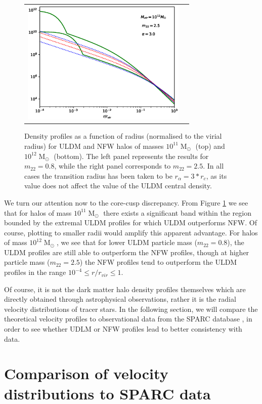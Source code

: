 \documentclass[a4paper,11pt]{article}
\begin{document}
\begin{figure}
\begin{tabular}{cc}
{\includegraphics[width = 3.1in, trim={2.1cm 0.5cm 0cm 0.5cm}]{pics/12_25_3.eps}}
\end{tabular}
\caption{Density profiles as a function of radius (normalised to the virial radius) for ULDM and NFW halos of masses $10^{11}\operatorname{M}_{\odot}$ (top) and $10^{12}\operatorname{M}_{\odot}$ (bottom). The left panel represents the results for $m_{22} = 0.8$, while the right panel corresponds to $m_{22}=2.5$. In all cases the transition radius has been taken to be $r_{\alpha} = 3*r_c$, as its value does not affect the value of the ULDM central density.}\label{fig:profiles}
\end{figure}


We turn our attention now to the core-cusp discrepancy. From Figure \ref{fig:profiles} we see that for halos of mass $10^{11}\operatorname{M}_{\odot}$ there exists a significant band within the region bounded by the extremal ULDM profiles for which ULDM outperforms NFW.  Of course, plotting to smaller radii would amplify this apparent advantage. For halos of mass $10^{12}\operatorname{M}_{\odot}$, we see that for lower ULDM particle mass ($m_{22}=0.8$), the ULDM profiles are still able to outperform the NFW profiles, though at higher particle mass ($m_{22}=2.5$) the  NFW profiles tend to outperform the ULDM profiles in the range $10^{-4}\leq r/r_{vir} \leq 1$.

Of course, it is not the dark matter halo density profiles themselves which are directly obtained through astrophysical observations, rather it is the radial velocity distributions of tracer stars. In the following section, we will compare the theoretical velocity profiles to observational data from the SPARC database \cite{Lelli:2016zqa}, in order to see whether UDLM or NFW profiles lead to better consistency with data. 

\section{Comparison of velocity distributions to SPARC data}
\end{document}
